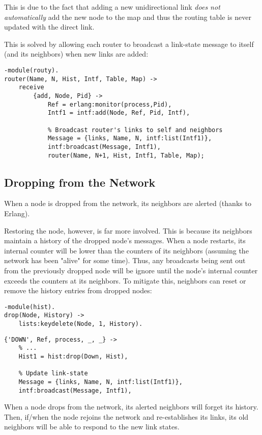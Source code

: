 \documentclass[a4paper, 10pt]{article}
\begin{document}
This is due to the fact that adding a new unidirectional link \textit{does not automatically} add the new node to the map and thus the routing table is never updated with the direct link.

This is solved by allowing each router to broadcast a link-state message to itself (and its neighbors) when new links are added:
\begin{verbatim}
-module(routy).
router(Name, N, Hist, Intf, Table, Map) ->
    receive
        {add, Node, Pid} ->
            Ref = erlang:monitor(process,Pid),
            Intf1 = intf:add(Node, Ref, Pid, Intf),

            % Broadcast router's links to self and neighbors
            Message = {links, Name, N, intf:list(Intf1)},
            intf:broadcast(Message, Intf1),
            router(Name, N+1, Hist, Intf1, Table, Map);
\end{verbatim}

\subsection{Dropping from the Network}
When a node is dropped from the network, its neighbors are alerted (thanks to Erlang).

Restoring the node, however, is far more involved. This is because its neighbors maintain a history of the dropped node's messages. When a node restarts, its internal counter will be lower than the counters of its neighbors (assuming the network has been "alive" for some time). Thus, any broadcasts being sent out from the previously dropped node will be ignore until the node's internal counter exceeds the counters at its neighbors. To mitigate this, neighbors can reset or remove the history entries from dropped nodes:

\begin{verbatim}
-module(hist).
drop(Node, History) ->
    lists:keydelete(Node, 1, History).
\end{verbatim}

\begin{verbatim}
{'DOWN', Ref, process, _, _} ->
    % ...
    Hist1 = hist:drop(Down, Hist),

    % Update link-state
    Message = {links, Name, N, intf:list(Intf1)},
    intf:broadcast(Message, Intf1),
\end{verbatim}

When a node drops from the network, its alerted neighbors will forget its history. Then, if/when the node rejoins the network and re-establishes its links, its old neighbors will be able to respond to the new link states.
\end{document}
